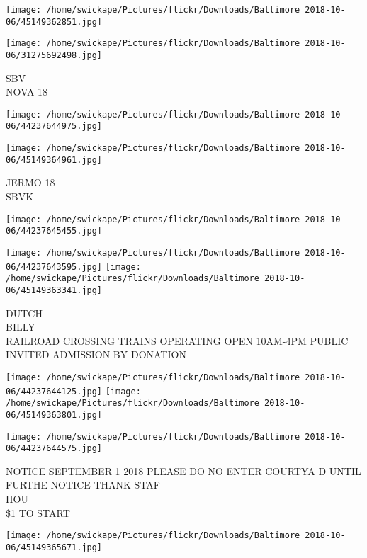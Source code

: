 \documentclass[10pt,letterpaper]{article}
\begin{document}
\texttt{[image: /home/swickape/Pictures/flickr/Downloads/Baltimore 2018-10-06/45149362851.jpg]}

\vspace{0.25in}
\texttt{[image: /home/swickape/Pictures/flickr/Downloads/Baltimore 2018-10-06/31275692498.jpg]}

SBV\\
NOVA 18\\
\pagebreak

\texttt{[image: /home/swickape/Pictures/flickr/Downloads/Baltimore 2018-10-06/44237644975.jpg]}

\vspace{0.25in}
\texttt{[image: /home/swickape/Pictures/flickr/Downloads/Baltimore 2018-10-06/45149364961.jpg]}

JERMO 18\\
SBVK\\
\pagebreak

\texttt{[image: /home/swickape/Pictures/flickr/Downloads/Baltimore 2018-10-06/44237645455.jpg]}

\vspace{0.25in}
\texttt{[image: /home/swickape/Pictures/flickr/Downloads/Baltimore 2018-10-06/44237643595.jpg]}
\texttt{[image: /home/swickape/Pictures/flickr/Downloads/Baltimore 2018-10-06/45149363341.jpg]}

DUTCH\\
BILLY\\
RAILROAD CROSSING TRAINS OPERATING OPEN 10AM{-}4PM PUBLIC INVITED ADMISSION BY DONATION\\
\pagebreak

\texttt{[image: /home/swickape/Pictures/flickr/Downloads/Baltimore 2018-10-06/44237644125.jpg]}
\texttt{[image: /home/swickape/Pictures/flickr/Downloads/Baltimore 2018-10-06/45149363801.jpg]}

\texttt{[image: /home/swickape/Pictures/flickr/Downloads/Baltimore 2018-10-06/44237644575.jpg]}

NOTICE SEPTEMBER 1 2018 PLEASE DO NO ENTER COURTYA D UNTIL FURTHE NOTICE THANK STAF\\
HOU\\
\$1 TO START\\
\pagebreak

\texttt{[image: /home/swickape/Pictures/flickr/Downloads/Baltimore 2018-10-06/45149365671.jpg]}
\end{document}
